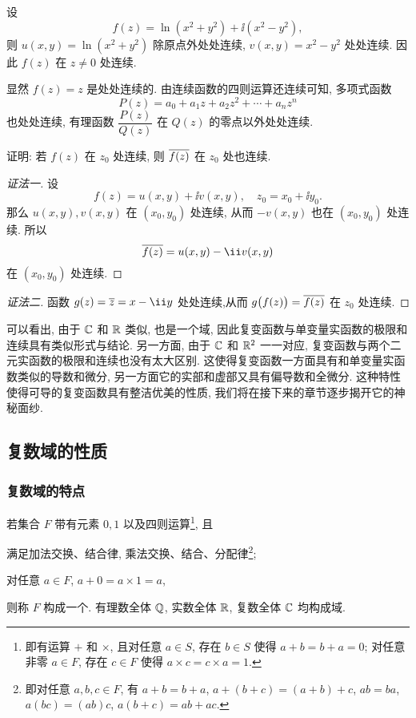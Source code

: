 \begin{exampleenum}
  \item 设
  \[
    f(z)=\ln(x^2+y^2)+\ii(x^2-y^2),
  \]
  则 $u(x,y)=\ln(x^2+y^2)$ 除原点外处处连续, $v(x,y)=x^2-y^2$ 处处连续. 因此 $f(z)$ 在 $z\neq0$ 处连续.
  \item 显然 $f(z)=z$ 是处处连续的.
  由连续函数的四则运算还连续可知, 多项式函数
  \[
    P(z)=a_0+a_1z+a_2z^2+\cdots+a_nz^n
  \]
  也处处连续, 有理函数 $\dfrac{P(z)}{Q(z)}$ 在 $Q(z)$ 的零点以外处处连续.
\end{exampleenum}

\begin{example}
  证明: 若 $f(z)$ 在 $z_0$ 处连续, 则 $\overline{f(z)}$ 在 $z_0$ 处也连续.
\end{example}

\begin{proof}[证法一]
  设
  \[
    f(z)=u(x,y)+\ii v(x,y),\quad
    z_0=x_0+\ii y_0.
  \]
  那么 $u(x,y),v(x,y)$ 在 $(x_0,y_0)$ 处连续, 从而 $-v(x,y)$ 也在 $(x_0,y_0)$ 处连续.
  所以
  \[
    \ov{f(z)}=u(x,y)-\ii v(x,y)
  \]
  在 $(x_0,y_0)$ 处连续.
\end{proof}

\begin{proof}[证法二]
  函数 $g(z)=\ov z=x-\ii y$ 处处连续,从而 $g\bigl(f(z)\bigr)=\overline{f(z)}$ 在 $z_0$ 处连续.
\end{proof}

可以看出, 由于 ${\mathbb{C}}$ 和 ${\mathbb{R}}$ 类似, 也是一个域, 因此复变函数与单变量实函数的极限和连续具有类似形式与结论.
另一方面, 由于 ${\mathbb{C}}$ 和 ${\mathbb{R}}^2$ 一一对应, 复变函数与两个二元实函数的极限和连续也没有太大区别.
这使得复变函数一方面具有和单变量实函数类似的导数和微分, 另一方面它的实部和虚部又具有偏导数和全微分.
这种特性使得可导的复变函数具有整洁优美的性质, 我们将在接下来的章节逐步揭开它的神秘面纱.


\subsection{复数域的性质\optional}
\label{ssec:complex-field}

\subsubsection{复数域的特点}

若集合 $F$ 带有元素 $0,1$ 以及四则运算\footnote{%
  即有运算 $+$ 和 $\times$, 且对任意 $a\in S$, 存在 $b\in S$ 使得 $a+b=b+a=0$; 对任意非零 $a\in F$, 存在 $c\in F$ 使得 $a\times c=c\times a=1$.%
}, 且
\begin{enuma}
  \item 满足加法交换、结合律, 乘法交换、结合、分配律\footnote{即对任意 $a,b,c\in F$, 有 $a+b=b+a$, $a+(b+c)=(a+b)+c$, $ab=ba$, $a(bc)=(ab)c$, $a(b+c)=ab+ac$.};
  \item 对任意 $a\in F$, $a+0=a\times 1=a$,
\end{enuma}\parnoindent
则称 $F$ 构成一个.
有理数全体 ${\mathbb{Q}}$, 实数全体 ${\mathbb{R}}$, 复数全体 ${\mathbb{C}}$ 均构成域.

